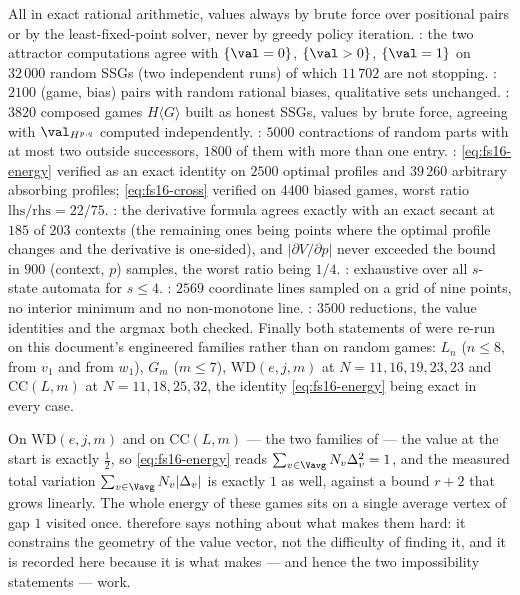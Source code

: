 \begin{remark}\label{rem:fs16-checks}
All in exact rational arithmetic, values always by brute force over positional
pairs or by the least-fixed-point solver, never by greedy policy iteration.
: the two attractor computations agree
with $\{\val=0\}$, $\{\val>0\}$, $\{\val=1\}$ on $32\,000$ random SSGs (two
independent runs) of which $11\,702$ are not stopping.
: $2100$ (game, bias) pairs with
random rational biases, qualitative sets unchanged. :
$3820$ composed games $H\langle G\rangle$ built as honest SSGs, values by
brute force, agreeing with $\val_{H^{p,q}}$ computed independently.
: $5000$ contractions of random parts with at most two
outside successors, $1800$ of them with more than one entry.
: \eqref{eq:fs16-energy} verified as an exact identity on
$2500$ optimal profiles and $39\,260$ arbitrary absorbing profiles;
\eqref{eq:fs16-cross} verified on $4400$ biased games, worst ratio
$\mathrm{lhs}/\mathrm{rhs}=22/75$. : the derivative formula
agrees exactly with an exact secant at $185$ of $203$ contexts (the remaining
ones being points where the optimal profile changes and the derivative is
one-sided), and $|\partial V/\partial p|$ never exceeded the bound in $900$
(context, $p$) samples, the worst ratio being $1/4$.
: exhaustive over all $s$-state automata for $s\le4$.
: $2569$ coordinate lines sampled on a
grid of nine points, no interior minimum and no non-monotone line.
: $3500$ reductions, the value identities and the
argmax both checked. Finally both statements of  were
re-run on this document's engineered families rather than on random games:
$L_n$ ($n\le8$, from $v_1$ and from $w_1$), $G_m$ ($m\le7$), $\mathrm{WD}(e,j,m)$
at $N=11,16,19,23,23$ and $\mathrm{CC}(L,m)$ at $N=11,18,25,32$, the identity
\eqref{eq:fs16-energy} being exact in every case.
\end{remark}

\begin{remark}\label{rem:fs16-blind}
On $\mathrm{WD}(e,j,m)$ and on $\mathrm{CC}(L,m)$ --- the two families of
 --- the value at the start is exactly
$\tfrac12$, so \eqref{eq:fs16-energy} reads
$\sum_{v\in\Vavg}N_v\Delta_v^{2}=1$, and the measured total variation
$\sum_{v\in\Vavg}N_v|\Delta_v|$ is exactly $1$ as well, against a bound $r+2$
that grows linearly. The whole energy of these games sits on a single average
vertex of gap $1$ visited once.  therefore says nothing
about what makes them hard: it constrains the geometry of the value vector, not
the difficulty of finding it, and it is recorded here because it is what makes
 --- and hence the two impossibility statements --- work.
\end{remark}